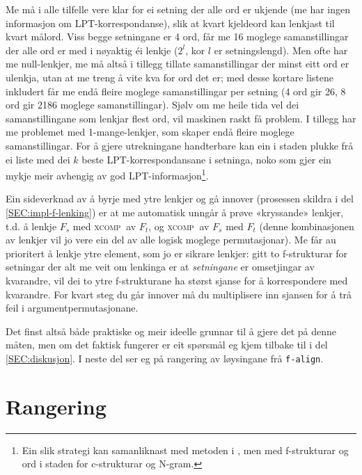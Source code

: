 \documentclass[12pt,a4paper,oneside,draft]{report}
\newcommand{\F}[2]{\textsc{#1}\ensuremath{_{#2}}}
\newcommand{\XCOMPs}{\F{xcomp~}{}}
\begin{document}
Me må i alle tilfelle vere klar for ei setning der alle ord er ukjende
 (me har ingen informasjon om LPT\hyp{}korrespondanse), slik at kvart
 kjeldeord kan lenkjast til kvart målord. Viss begge setningane er 4
 ord, får me 16 moglege samanstillingar der alle ord er med i nøyaktig
 éi lenkje ($2^l$, kor $l$ er setningslengd). Men ofte har me
 null-lenkjer, me må altså i tillegg tillate samanstillingar der minst
 eitt ord er ulenkja, utan at me treng å vite kva for ord det er; med
 desse kortare listene inkludert får me endå fleire moglege
 samanstillingar per setning (4 ord gir 26, 8 ord gir 2186 moglege
 samanstillingar). Sjølv om me heile tida vel dei samanstillingane som
 lenkjar flest ord, vil maskinen raskt få problem. I tillegg har me
 problemet med 1-mange-lenkjer, som skaper endå fleire moglege
 samanstillingar. For å gjere utrekningane handterbare kan ein i
 staden plukke frå ei liste med dei $k$ beste LPT\hyp{}korrespondansane i
 setninga, noko som gjer ein mykje meir avhengig av god
 LPT\hyp{}informasjon\footnote{Ein slik strategi kan samanliknast med metoden i
        \citet{samuelsson2007apa}, men med f\hyp{}strukturar og ord i
        staden for c\hyp{}strukturar og N-gram. }.

Ein sideverknad av å byrje med ytre lenkjer og gå innover (prosessen
 skildra i del \ref{SEC:impl-f-lenking}) er at me automatisk unngår å
 prøve «kryssande» lenkjer, t.d. å lenkje $F_s$ med \XCOMPs av $F_t$,
 og \XCOMPs av $F_s$ med $F_t$ (denne kombinasjonen av lenkjer vil jo
 vere ein del av alle logisk moglege permutasjonar). Me får au
 prioritert å lenkje ytre element, som jo er sikrare lenkjer: gitt to
 f\hyp{}strukturar for setningar der alt me veit om lenkinga er at
 \emph{setningane} er omsetjingar av kvarandre, vil dei to ytre
 f\hyp{}strukturane ha størst sjanse for å korrespondere med kvarandre. For
 kvart steg du går innover må du multiplisere inn sjansen for å trå
 feil i argumentpermutasjonane.

Det finst altså både praktiske og meir ideelle grunnar til å gjere det
 på denne måten, men om det faktisk fungerer er eit spørsmål eg kjem
 tilbake til i del \ref{SEC:diskusjon}. I neste del ser eg på
 rangering av løysingane frå \texttt{f-align}.

\section{Rangering}
\label{sec-4.2}

\label{SEC:impl-f-rangering}
\end{document}
